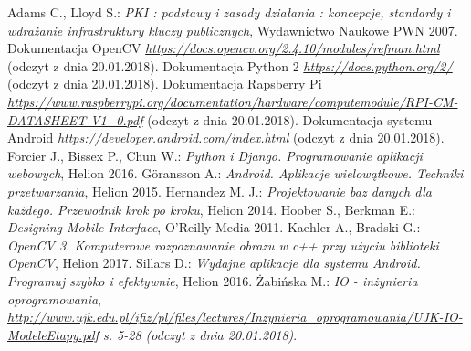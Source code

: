 \newpage
   \begin{thebibliography}{99}
    	Adams C., Lloyd S.: 
    	\textit{PKI : podstawy i zasady działania : koncepcje, standardy i wdrażanie infrastruktury kluczy publicznych}, Wydawnictwo Naukowe PWN 2007.
    	Dokumentacja OpenCV
    	\textit{ \href {https://docs.opencv.org/2.4.10/modules/refman.html} {https://docs.opencv.org/2.4.10/modules/refman.html}} (odczyt z dnia 20.01.2018).  
    	Dokumentacja Python 2
    	\textit{ \href  {https://docs.python.org/2/}{https://docs.python.org/2/} }(odczyt z dnia 20.01.2018).
    	Dokumentacja Rapsberry Pi \\
    	\textit{ \href {https://www.raspberrypi.org/documentation/hardware/computemodule/RPI-CM-DATASHEET-V1_0.pdf} {https://www.raspberrypi.org/documentation/hardware/computemodule/RPI-CM-DATASHEET-V1\_0.pdf} }(odczyt z dnia 20.01.2018). 
    	Dokumentacja systemu Android
    	\textit{ \href {https://developer.android.com/index.html} {https://developer.android.com/index.html} }(odczyt z dnia 20.01.2018). 
    	Forcier J., Bissex P., Chun W.:
    	\textit{Python i Django. Programowanie aplikacji webowych}, 
    	Helion 2016.
    	Göransson A.: 
    	\textit{Android. Aplikacje wielowątkowe. Techniki przetwarzania}, 
    	Helion 2015. 
    	Hernandez M. J.: 
    	\textit{Projektowanie baz danych dla każdego. Przewodnik krok po kroku}, 
    	Helion 2014.
    	Hoober S., Berkman E.: 
    	\textit{Designing Mobile Interface}, 
    	 O'Reilly Media 2011.
    	 Kaehler A., Bradski G.: 
    	 \textit{OpenCV 3. Komputerowe rozpoznawanie obrazu w c++ przy użyciu biblioteki OpenCV}, Helion 2017.
    	 Sillars D.:
    	 \textit{Wydajne aplikacje dla systemu Android. Programuj szybko i efektywnie}, 
    	 Helion 2016.
    	 Żabińska M.: \textit{IO - inżynieria oprogramowania},\\
    	 \textit{\href{http://www.ujk.edu.pl/ifiz/pl/files/lectures/Inzynieria\_oprogramowania/UJK-IO-ModeleEtapy.pdf}{http://www.ujk.edu.pl/ifiz/pl/files/lectures/Inzynieria\_oprogramowania/UJK-IO-ModeleEtapy.pdf} s. 5-28 (odczyt z dnia 20.01.2018)}.
     \end{thebibliography}
 
